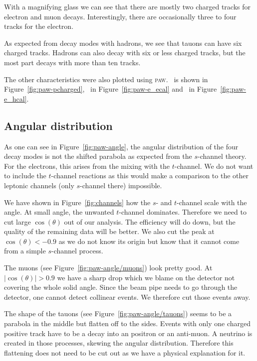\documentclass[11pt, english, fleqn, DIV=15, headinclude, BCOR=2cm]{scrreprt}
\begin{document}


With a magnifying glass we can see that there are mostly two charged tracks for
electron and muon decays. Interestingly, there are occasionally three to four
tracks for the electron.

As expected from decay modes with hadrons, we see that tauons can have six
charged tracks. Hadrons can also decay with six or less charged tracks, but the
most part decays with more than ten tracks.

The other characteristics were also plotted using \textsc{paw}. \pcharged\ is
shown in Figure~\ref{fig:paw-pcharged}, \eecal\ in Figure~\ref{fig:paw-e_ecal}
and \ehcal\ in Figure~\ref{fig:paw-e_hcal}.

\subsection{Angular distribution}

As one can see in Figure~\ref{fig:paw-angle}, the angular distribution of the
four decay modes is not the shifted parabola as expected from the $s$-channel
theory. For the electrons, this arises from the mixing with the $t$-channel. We
do not want to include the $t$-channel reactions as this would make a
comparison to the other leptonic channels (only $s$-channel there) impossible.

We have shown in Figure~\ref{fig:channels} how the $s$- and $t$-channel scale
with the angle. At small angle, the unwanted $t$-channel dominates. Therefore
we need to cut large $\cos(\theta)$ out of our analysis. The efficiency will do
down, but the quality of the remaining data will be better. We also cut the
peak at $\cos(\theta) < -0.9$ as we do not know its origin but know that it
cannot come from a simple $s$-channel process.



The muons (see Figure~\ref{fig:paw-angle/muons}) look pretty good. At
$|\cos(\theta)| > 0.9$ we have a sharp drop which we blame on the detector not
covering the whole solid angle. Since the beam pipe needs to go through the
detector, one cannot detect collinear events. We therefore cut those events
away.

The shape of the tauons (see Figure~\ref{fig:paw-angle/tauons}) seems to be a
parabola in the middle but flatten off to the sides. Events with only one
charged positive track have to be a decay into an positron or an anti-muon. A
neutrino is created in those processes, skewing the angular distribution.
Therefore this flattening does not need to be cut out as we have a physical
explanation for it.
\end{document}
